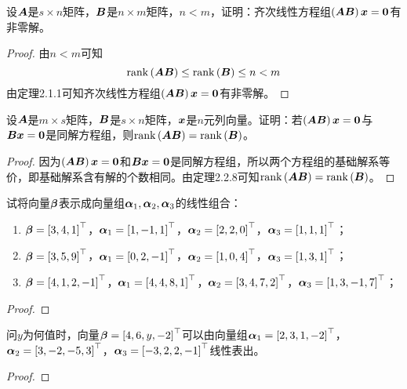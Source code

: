 \begin{problem}\label{problem-2.21}
设\(\mata\)是\(s\times n\)矩阵，\(\matb\)是\(n\times m\)矩阵，\(n<m\)，证明：齐次线性方程组\(\spar{\mata\matb}\vecx=\veczero\)有非零解。
\end{problem}
\begin{proof}
    由\(n<m\)可知
    \begin{equation*}
        \rank{\mata\matb}\leq\rank{\matb}\leq n<m
    \end{equation*}
    由定理2.1.1可知齐次线性方程组\(\spar{\mata\matb}\vecx=\veczero\)有非零解。
\end{proof}

\begin{problem}\label{problem-2.22}
设\(\mata\)是\(m\times s\)矩阵，\(\matb\)是\(s\times n\)矩阵，\(\vecx\)是\(n\)元列向量。证明：若\(\spar{\mata\matb}\vecx=\veczero\)与\(\matb\vecx=\veczero\)是同解方程组，则\(\rank{\mata\matb}=\rank{\matb}\)。
\end{problem}
\begin{proof}
    因为\(\spar{\mata\matb}\vecx=\veczero\)和\(\matb\vecx=\veczero\)是同解方程组，所以两个方程组的基础解系等价，即基础解系含有解的个数相同。由定理2.2.8可知\(\rank{\mata\matb}=\rank{\matb}\)。
\end{proof}

\begin{problem}\label{problem-2.23}
试将向量\(\vecbeta\)表示成向量组\(\vecal_1,\vecal_2,\vecal_3\)的线性组合：
\begin{enumerate}
    \item \(\vecbeta=\myvec{3,4,1}\)，\(\vecal_1=\myvec{1,-1,1}\)，\(\vecal_2=\myvec{2,2,0}\)，\(\vecal_3=\myvec{1,1,1}\)；
    \item \(\vecbeta=\myvec{3,5,9}\)，\(\vecal_1=\myvec{0,2,-1}\)，\(\vecal_2=\myvec{1,0,4}\)，\(\vecal_3=\myvec{1,3,1}\)；
    \item \(\vecbeta=\myvec{4,1,2,-1}\)，\(\vecal_1=\myvec{4,4,8,1}\)，\(\vecal_2=\myvec{3,4,7,2}\)，\(\vecal_3=\myvec{1,3,-1,7}\)；
\end{enumerate}
\end{problem}
\begin{proof}
\end{proof}

\begin{problem}\label{problem-2.24}
问\(y\)为何值时，向量\(\vecbeta=\myvec{4,6,y,-2}\)可以由向量组\(\vecal_1=\myvec{2,3,1,-2}\)，\(\vecal_2=\myvec{3,-2,-5,3}\)，\(\vecal_3=\myvec{-3,2,2,-1}\)线性表出。
\end{problem}
\begin{proof}
\end{proof}

